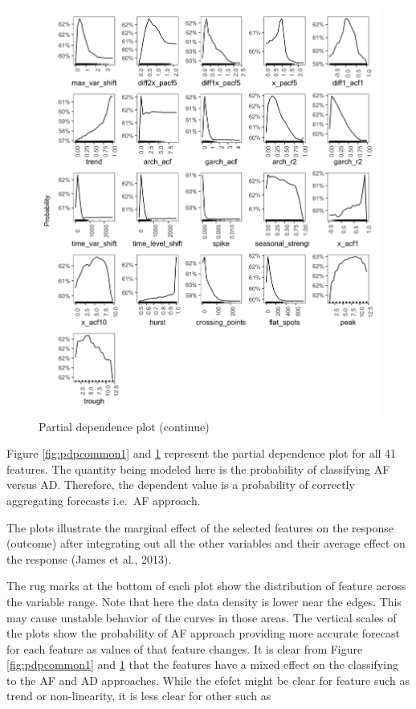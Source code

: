 \documentclass[]{elsarticle} %
\begin{document}
\begin{figure}[H]

{\centering \includegraphics[width=1\linewidth]{img/300dpi/pfinal1} 

}

\caption{Partial dependence plot (continue)}\label{fig:pdpcommon2}
\end{figure}

Figure \ref{fig:pdpcommon1} and \ref{fig:pdpcommon2} represent the
partial dependence plot for all 41 features. The quantity being modeled
here is the probability of classifying AF versus AD. Therefore, the
dependent value is a probability of correctly aggregating forecasts
i.e.~AF approach.

The plots illustrate the marginal effect of the selected features on the
response (outcome) after integrating out all the other variables and
their average effect on the response (James et al., 2013).

The rug marks at the bottom of each plot show the distribution of
feature across the variable range. Note that here the data density is
lower near the edges. This may cause unstable behavior of the curves in
those areas. The vertical scales of the plots show the probability of AF
approach providing more accurate forecast for each feature as values of
that feature changes. It is clear from Figure \ref{fig:pdpcommon1} and
\ref{fig:pdpcommon2} that the features have a mixed effect on the
classifying to the AF and AD approaches. While the efefct might be clear
for feature such as trend or non-linearity, it is less clear for other
such as
\end{document}

